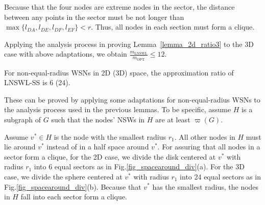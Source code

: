 \documentclass[journal,10pt]{IEEEtran}
\begin{document}
\begin{IEEEproof}
Because that the four nodes are extreme nodes in the sector, the distance between any points in the sector must be not longer than $\max\{l_{DA},l_{DE},l_{DF},l_{EF}\}{<}r$. Thus, all nodes in each section must form a clique.

Applying the analysis process in proving Lemma~\ref{lemma_2d_ratio3} to the 3D case with above adaptations, we obtain $\frac{m_\text{LNSWL}}{m_\text{OPT}}{\leq}12$.
\end{IEEEproof}

\begin{lemma}
\label{lemma_2d3d_ratio}
For non-equal-radius WSNs in 2D (3D) space, the approximation ratio of LNSWL-SS is 6 (24).
\end{lemma}

\begin{IEEEproof}
These can be proved by applying some adaptations for non-equal-radius WSNs to the analysis process used in the previous lemmas. To be specific, assume $H$ is a subgraph of $G$ such that the nodes' NSWs in $H$ are at least $\varpi(G)$.

Assume $v^{*}{\in}H$ is the node with the smallest radius $r_1$. All other nodes in $H$ must lie around $v^{*}$ instead of in a half space around $v^{*}$. For assuring that all nodes in a sector form a clique, for the 2D case, we divide the disk centered at $v^{*}$ with radius $r_1$ into 6 equal sectors as in Fig.\ref{fig_spacearound_div}(a). For the 3D case, we divide the sphere centered at $v^{*}$ with radius $r_1$ into 24 equal sectors as in Fig.\ref{fig_spacearound_div}(b). Because that $v^{*}$ has the smallest radius, the nodes in $H$ fall into each sector form a clique.


\end{IEEEproof}
\end{document}
